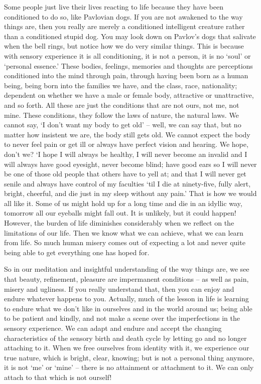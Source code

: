 Some people just live their lives reacting to life because they have been conditioned to do so, like Pavlovian dogs. If you are not awakened to the way things are, then you really are merely a conditioned intelligent creature rather than a conditioned stupid dog. You may look down on Pavlov's dogs that salivate when the bell rings, but notice how we do very similar things. This is because with sensory experience it is all conditioning, it is not a person, it is no `soul' or `personal essence.' These bodies, feelings, memories and thoughts are perceptions conditioned into the mind through pain, through having been born as a human being, being born into the families we have, and the class, race, nationality; dependent on whether we have a male or female body, attractive or unattractive, and so forth. All these are just the conditions that are not ours, not me, not mine. These conditions, they follow the laws of nature, the natural laws. We cannot say, `I don't want my body to get old' -- well, we can say that, but no matter how insistent we are, the body still gets old. We cannot expect the body to never feel pain or get ill or always have perfect vision and hearing. We hope, don't we? `I hope I will always be healthy, I will never become an invalid and I will always have good eyesight, never become blind; have good ears so I will never be one of those old people that others have to yell at; and that I will never get senile and always have control of my faculties `til I die at ninety-five, fully alert, bright, cheerful, and die just in my sleep without any pain.' That is how we would all like it. Some of us might hold up for a long time and die in an idyllic way, tomorrow all our eyeballs might fall out. It is unlikely, but it could happen! However, the burden of life diminishes considerably when we reflect on the limitations of our life. Then we know what we can achieve, what we can learn from life. So much human misery comes out of expecting a lot and never quite being able to get everything one has hoped for.

So in our meditation and insightful understanding of the way things are, we see that beauty, refinement, pleasure are impermanent conditions -- as well as pain, misery and ugliness. If you really understand that, then you can enjoy and endure whatever happens to you. Actually, much of the lesson in life is learning to endure what we don't like in ourselves and in the world around us; being able to be patient and kindly, and not make a scene over the imperfections in the sensory experience. We can adapt and endure and accept the changing characteristics of the sensory birth and death cycle by letting go and no longer attaching to it. When we free ourselves from identity with it, we experience our true nature, which is bright, clear, knowing; but is not a personal thing anymore, it is not `me' or `mine' -- there is no attainment or attachment to it. We can only attach to that which is not ourself!

